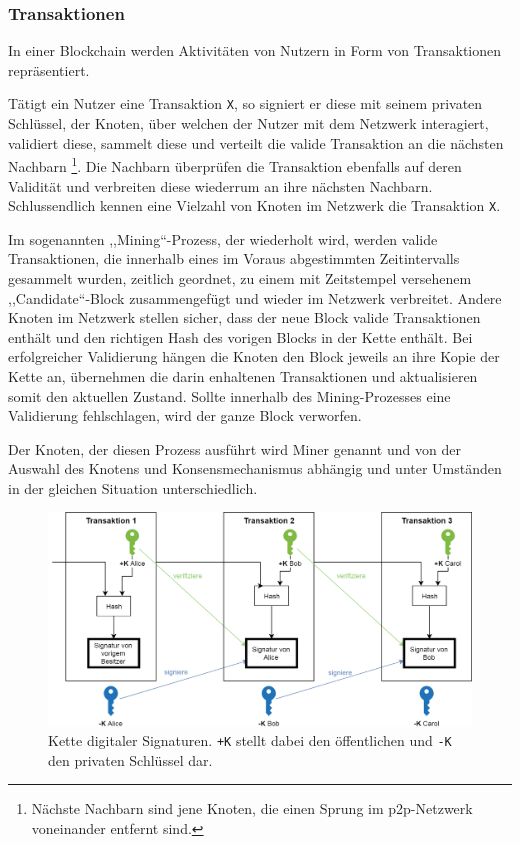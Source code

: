     \subsubsection{Transaktionen}
    \label{sec:sota_blockchain_trx}
    In einer Blockchain werden Aktivitäten von Nutzern in Form von Transaktionen repräsentiert. 
    
    Tätigt ein Nutzer eine Transaktion \lstinline{X}, so signiert er diese mit seinem privaten Schlüssel, der Knoten, über welchen der Nutzer mit dem Netzwerk interagiert, validiert diese, sammelt diese und verteilt die valide Transaktion an die nächsten Nachbarn
    \!\footnote{Nächste Nachbarn sind jene Knoten, die einen Sprung im \gls{p2p}-Netzwerk voneinander entfernt sind.}.
    Die Nachbarn überprüfen die Transaktion ebenfalls auf deren Validität und verbreiten diese wiederrum an ihre nächsten Nachbarn. 
    Schlussendlich kennen eine Vielzahl von Knoten im Netzwerk die Transaktion \lstinline{X}. 
    
    Im sogenannten ,,Mining``-Prozess, der wiederholt wird, werden valide Transaktionen, die innerhalb eines im Voraus abgestimmten Zeitintervalls gesammelt wurden, zeitlich geordnet, zu einem mit Zeitstempel versehenem ,,Candidate``-Block zusammengefügt und wieder im Netzwerk verbreitet. 
    Andere Knoten im Netzwerk stellen sicher, dass der neue Block valide Transaktionen enthält und den richtigen Hash des vorigen Blocks in der Kette enthält. 
    Bei erfolgreicher Validierung hängen die Knoten den Block jeweils an ihre Kopie der Kette an, übernehmen die darin enhaltenen Transaktionen und aktualisieren somit den aktuellen Zustand. 
    Sollte innerhalb des Mining-Prozesses eine Validierung fehlschlagen, wird der ganze Block verworfen.
    
    Der Knoten, der diesen Prozess ausführt wird Miner genannt und von der Auswahl des Knotens und Konsensmechanismus abhängig und unter Umständen in der gleichen Situation unterschiedlich.\cite{Christidis2016}
    
    \begin{figure}[H]
    	\centering
    	\includegraphics[width=\textwidth]{graphics/transaction.png}
    	\caption[Kette digitaler Signaturen]{Kette digitaler Signaturen\cite{Nakamoto2008}. \lstinline{+K} stellt dabei den öffentlichen und \lstinline{-K} den privaten Schlüssel dar.}
    	\label{fig:txio}
    \end{figure}
    
